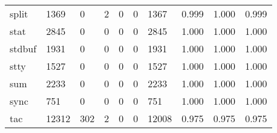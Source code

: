 \begin{longtable}{lp{2.0cm}p{2.0cm}p{2.0cm}p{2.0cm}p{2.0cm}p{2.0cm}p{2.0cm}p{2.0cm}p{2.0cm}}
split     &                   1369 &                                  0 &                                 2 &                                0 &                                 0 &                            1367 &                                0.999 &                                  1.000 &                                0.999 \\
stat      &                   2845 &                                  0 &                                 0 &                                0 &                                 0 &                            2845 &                                1.000 &                                  1.000 &                                1.000 \\
stdbuf    &                   1931 &                                  0 &                                 0 &                                0 &                                 0 &                            1931 &                                1.000 &                                  1.000 &                                1.000 \\
stty      &                   1527 &                                  0 &                                 0 &                                0 &                                 0 &                            1527 &                                1.000 &                                  1.000 &                                1.000 \\
sum       &                   2233 &                                  0 &                                 0 &                                0 &                                 0 &                            2233 &                                1.000 &                                  1.000 &                                1.000 \\
sync      &                    751 &                                  0 &                                 0 &                                0 &                                 0 &                             751 &                                1.000 &                                  1.000 &                                1.000 \\
tac       &                  12312 &                                302 &                                 2 &                                0 &                                 0 &                           12008 &                                0.975 &                                  0.975 &                                0.975 \\

\end{longtable}
